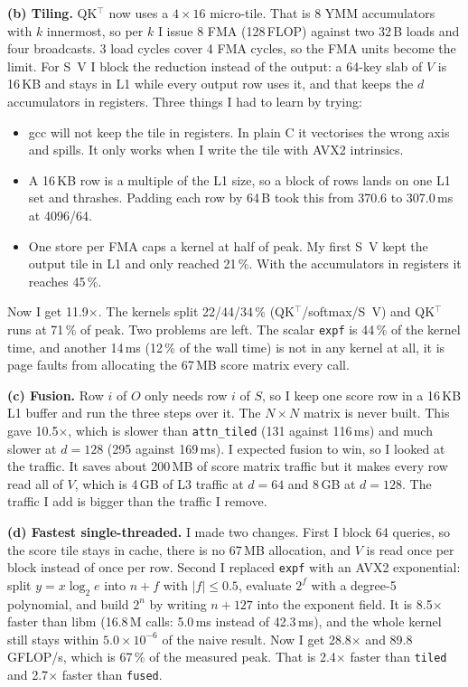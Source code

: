 \documentclass[10pt,a4paper]{article}
\newcommand{\var}[1]{\texttt{#1}}
\begin{document}
\textbf{(b) Tiling.} QK$^\top$ now uses a $4\times16$ micro-tile. That is 8 YMM
accumulators with $k$ innermost, so per $k$ I issue 8 FMA (128\,FLOP) against two
32\,B loads and four broadcasts. 3 load cycles cover 4 FMA cycles, so the FMA
units become the limit. For S~V I block the reduction instead of the output: a
64-key slab of $V$ is 16\,KB and stays in L1 while every output row uses it, and
that keeps the $d$ accumulators in registers. Three things I had to learn by
trying:
\begin{itemize}\itemsep0pt
\item gcc will not keep the tile in registers. In plain C it vectorises the
wrong axis and spills. It only works when I write the tile with AVX2 intrinsics.
\item A 16\,KB row is a multiple of the L1 size, so a block of rows lands on one
L1 set and thrashes. Padding each row by 64\,B took this from 370.6 to 307.0\,ms
at 4096/64.
\item One store per FMA caps a kernel at half of peak. My first S~V kept the
output tile in L1 and only reached 21\,\%. With the accumulators in registers it
reaches 45\,\%.
\end{itemize}
Now I get 11.9$\times$. The kernels split
22/44/34\,\%
(QK$^\top$/softmax/S~V) and QK$^\top$ runs at 71\,\% of peak.
Two problems are left. The scalar \var{expf} is
44\,\% of the kernel time, and another
14\,ms (12\,\% of the wall
time) is not in any kernel at all, it is page faults from allocating the 67\,MB
score matrix every call.

\textbf{(c) Fusion.} Row $i$ of $O$ only needs row $i$ of $S$, so I keep one
score row in a 16\,KB L1 buffer and run the three steps over it. The $N\times N$
matrix is never built. This gave 10.5$\times$,
which is slower than \var{attn\_tiled} (131 against
116\,ms) and much slower at $d{=}128$
(295 against 169\,ms).
I expected fusion to win, so I looked at the traffic. It saves about 200\,MB of
score matrix traffic but it makes every row read all of $V$, which is 4\,GB of L3
traffic at $d{=}64$ and 8\,GB at $d{=}128$. The traffic I add is bigger than the
traffic I remove.

\textbf{(d) Fastest single-threaded.} I made two changes. First I block 64
queries, so the score tile stays in cache, there is no 67\,MB allocation, and $V$
is read once per block instead of once per row. Second I replaced \var{expf} with
an AVX2 exponential: split $y=x\log_2 e$ into $n+f$ with $|f|\le0.5$, evaluate
$2^f$ with a degree-5 polynomial, and build $2^n$ by writing $n+127$ into the
exponent field. It is 8.5$\times$ faster than libm (16.8\,M calls: 5.0\,ms
instead of 42.3\,ms), and the whole kernel still stays within
$5.0\times10^{-6}$ of the naive result. Now I get 28.8$\times$ and
89.8\,GFLOP/s, which is 67\,\% of
the measured peak. That is 2.4$\times$ faster
than \var{tiled} and 2.7$\times$ faster than
\var{fused}.
\end{document}
